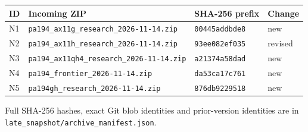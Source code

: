 \begin{center}
\footnotesize
\setlength{\tabcolsep}{2pt}
\begin{tabular}{@{}>{\raggedright\arraybackslash}p{.05\linewidth}>{\raggedright\arraybackslash}p{.52\linewidth}>{\raggedright\arraybackslash}p{.23\linewidth}>{\raggedright\arraybackslash}p{.13\linewidth}@{}}
\toprule
ID & Incoming ZIP & SHA-256 prefix & Change\\
\midrule
N1 & \nolinkurl{pa194_ax11g_research_2026-11-14.zip} & \texttt{00445addbde8} & new\\[4pt]
N2 & \nolinkurl{pa194_ax11h_research_2026-11-14.zip} & \texttt{93ee082ef035} & revised\\[4pt]
N3 & \nolinkurl{pa194_ax11qh4_research_2026-11-14.zip} & \texttt{a21374a58dad} & new\\[4pt]
N4 & \nolinkurl{pa194_frontier_2026-11-14.zip} & \texttt{da53ca17c761} & new\\[4pt]
N5 & \nolinkurl{pa194gh_research_2026-11-14.zip} & \texttt{876db9229518} & new\\[4pt]
\bottomrule
\end{tabular}
\end{center}
Full SHA-256 hashes, exact Git blob identities and prior-version identities are in \nolinkurl{late_snapshot/archive_manifest.json}.
